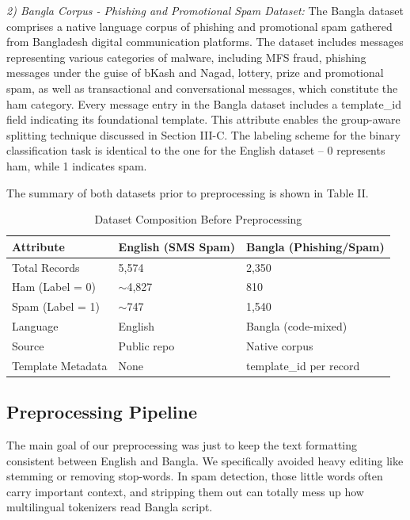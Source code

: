 \documentclass[journal]{IEEEtran}
\begin{document}
\textit{2) Bangla Corpus - Phishing and Promotional Spam Dataset:} The
Bangla dataset comprises a native language corpus of phishing and
promotional spam gathered from Bangladesh digital communication
platforms. The dataset includes messages representing various
categories of malware, including MFS fraud, phishing messages under the
guise of bKash and Nagad, lottery, prize and promotional spam, as well
as transactional and conversational messages, which constitute the ham
category. Every message entry in the Bangla dataset includes a template\_id field indicating its foundational template. This attribute enables the group-aware
splitting technique discussed in Section III-C. The labeling scheme for
the binary classification task is identical to the one for the English
dataset -- 0 represents ham, while 1 indicates spam.

The summary of both datasets prior to preprocessing is shown in Table
II.

\begin{table}[htbp]
\caption{Dataset Composition Before Preprocessing}
\label{tab:dataset_raw}
\centering
\begin{tabular}{lll}
\toprule
\textbf{Attribute} & \textbf{English (SMS Spam)} & \textbf{Bangla (Phishing/Spam)} \\
\midrule
Total Records & 5,574 & 2,350 \\
Ham (Label = 0) & $\sim$4,827 & 810 \\
Spam (Label = 1) & $\sim$747 & 1,540 \\
Language & English & Bangla (code-mixed) \\
Source & Public repo \cite{ref1} & Native corpus \\
Template Metadata & None & template\_id per record \\
\bottomrule
\end{tabular}
\end{table}

\subsection{Preprocessing Pipeline}

The main goal of our preprocessing was just to keep the text formatting consistent between English and Bangla. We specifically avoided heavy editing like stemming or removing stop-words. In spam detection, those little words often carry important context, and stripping them out can totally mess up how multilingual tokenizers read Bangla script.
\end{document}
